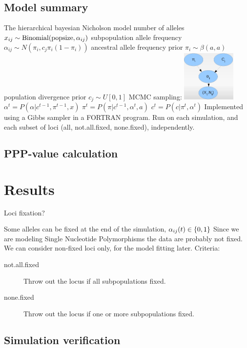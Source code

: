\documentclass[a4paper,12pt]{article}
\begin{document}
\subsection{Model summary}
{The hierarchical bayesian Nicholson model}{
 number of alleles $x_{ij}\sim \operatorname{Binomial}(\text{popsize},\alpha_{ij})$
 subpopulation allele frequency $\alpha_{ij}\sim N(\pi_i, c_j \pi_i(1-\pi_i))$
 ancestral allele frequency prior $\pi_i\sim \beta(a,a)$
 population divergence prior $c_j\sim U[0,1]$
 MCMC sampling: \includegraphics[width=0.2\textwidth]{nicholson-model}
 $\alpha^t = P(\alpha|c^{t-1},\pi^{t-1},x)$
 $\pi^t = P(\pi|c^{t-1},\alpha^t,a)$
 $c^t = P(c|\pi^t,\alpha^t)$
 Implemented using a Gibbs sampler in a FORTRAN program.
 Run on each simulation, and each subset of loci (all,
  not.all.fixed, none.fixed), independently.
}

\subsection{PPP-value calculation}

\section{Results}


Loci fixation?

 Some alleles can be fixed at the end of the simulation,
  $\alpha_{ij}(t)\in\{0,1\}$
 Since we are modeling Single Nucleotide Polymorphisms the data
  are probably not fixed.
 We can consider non-fixed loci only, for the model fitting
  later.
 Criteria:
\begin{description}
\item[not.all.fixed] Throw out the locus if all subpopulations fixed.
\item[none.fixed] Throw out the locus if one or more subpopulations fixed.
\end{description}


\subsection{Simulation verification}

\end{document}
